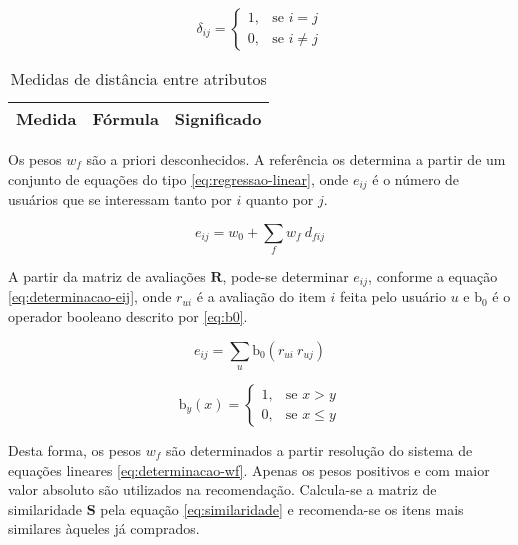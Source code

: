 \begin{equation}
\label{eq:delta}
\delta_{ij} = 
\begin{cases}
1, &\text{se }i=j \\
0, &\text{se }i \neq j
\end{cases} 
\end{equation}

\begin{table}[H]
\begin{center}
    \caption{Medidas de distância entre atributos}
    \label{tab:medidas-distancia}
    \begin{tabular}{ | l | c | p{5cm} | }
    \hline
    \textbf{Medida} & \textbf{Fórmula} & \textbf{Significado} \\ \hline
    \end{tabular}
\end{center}
\end{table}
 
Os pesos $w_f$ são a priori desconhecidos. A referência \cite{symeonidis2007feature} os determina a partir de um conjunto de equações do tipo \ref{eq:regressao-linear}, onde $e_{ij}$ é o número de usuários que se interessam tanto por $i$ quanto por $j$. 

\begin{equation}
\label{eq:regressao-linear} 
    e_{ij} = w_0 + \sum_{f}{w_{f} ~ d_{fij}}
\end{equation} 

A partir da matriz de avaliações $\mathbf{R}$, pode-se determinar $e_{ij}$, conforme a equação \ref{eq:determinacao-eij}, onde $r_{ui}$ é a avaliação do item $i$ feita pelo usuário $u$ e $\mathrm{b_0}$ é o operador booleano descrito por \ref{eq:b0}.

\begin{equation}
\label{eq:determinacao-eij} 
    e_{ij} = \sum_{u}{\mathrm{b_0}\left(r_{ui} ~ r_{uj}\right)}
\end{equation} 

\begin{equation}
\label{eq:b0}
\mathrm{b}_y\left(x\right) = 
\begin{cases}
1, &\text{se }x>y \\
0, &\text{se }x\leq y
\end{cases} 
\end{equation}

Desta forma, os pesos $w_f$ são determinados a partir resolução do sistema de equações lineares \ref{eq:determinacao-wf}. Apenas os pesos positivos e com maior valor absoluto são utilizados na recomendação. Calcula-se a matriz de similaridade $\mathbf{S}$ pela equação \ref{eq:similaridade} e recomenda-se os itens mais similares àqueles já comprados.  

